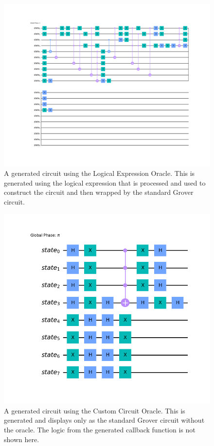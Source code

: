 \documentclass[11pt]{article}
\begin{document}
\begin{figure}[p]
\caption{A generated circuit using the Logical Expression Oracle. This is generated using the logical expression that is processed and used to construct the circuit and then wrapped by the standard Grover circuit.}
\includegraphics[width=\textwidth]{logical_expression_grover.png}
\centering
\end{figure}


\begin{figure}[p]
\caption{A generated circuit using the Custom Circuit Oracle. This is generated and displays only as the standard Grover circuit without the oracle. The logic from the generated callback function is not shown here.}
\includegraphics[width=\textwidth]{custom_circuit_grover.png}
\centering
\end{figure}
\end{document}
